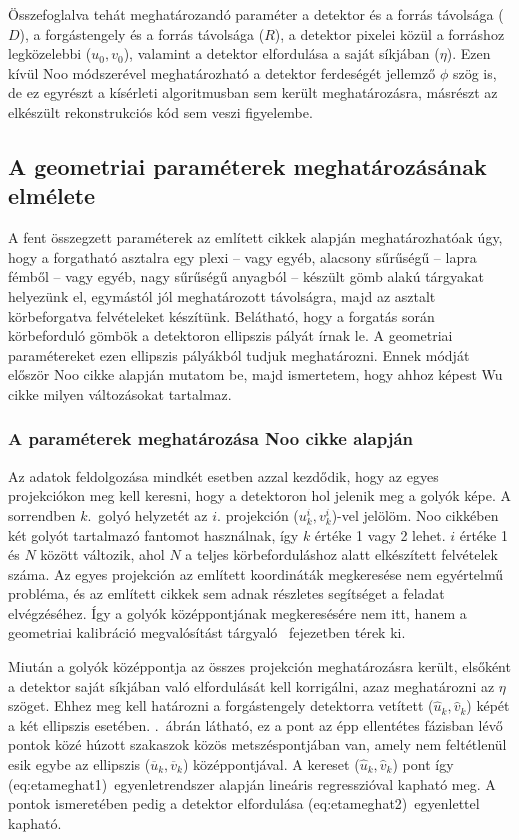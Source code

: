 \documentclass[a4paper,12pt]{article}
\begin{document}
 Összefoglalva tehát meghatározandó paraméter a detektor és a forrás távolsága ($D$), a forgástengely és a forrás távolsága ($R$), a detektor pixelei közül a forráshoz legközelebbi ($u_0,v_0$), valamint a detektor elfordulása a saját síkjában ($\eta$).  Ezen kívül Noo módszerével meghatározható a detektor ferdeségét jellemző $\phi$ szög is, de ez egyrészt a kísérleti algoritmusban sem került meghatározásra, másrészt az elkészült rekonstrukciós kód sem veszi figyelembe.
 

\subsection{A geometriai paraméterek meghatározásának elmélete}

A fent összegzett paraméterek az említett cikkek alapján meghatározhatóak úgy, hogy a forgatható asztalra egy plexi --  vagy egyéb, alacsony sűrűségű -- lapra fémből -- vagy egyéb, nagy sűrűségű anyagból -- készült gömb alakú tárgyakat helyezünk el, egymástól jól meghatározott távolságra, majd az asztalt körbeforgatva felvételeket készítünk. Belátható\cite{noo}, hogy a forgatás során körbeforduló gömbök a detektoron ellipszis pályát írnak le. A geometriai paramétereket ezen ellipszis pályákból tudjuk meghatározni.
Ennek módját először Noo cikke alapján mutatom be, majd ismertetem, hogy ahhoz képest Wu cikke milyen változásokat tartalmaz.

\subsubsection{A paraméterek meghatározása Noo\cite{noo} cikke alapján}
\label{sec:noo}


Az adatok feldolgozása mindkét esetben azzal kezdődik, hogy az egyes projekciókon meg kell keresni, hogy a detektoron hol jelenik meg a golyók képe. A sorrendben $k$.\ golyó helyzetét az $i$. projekción ($u_k^i, v_k^i$)-vel jelölöm. Noo cikkében két golyót tartalmazó fantomot használnak, így $k$ értéke 1 vagy 2 lehet. $i$ értéke 1 és $N$ között változik, ahol $N$ a teljes körbeforduláshoz alatt elkészített felvételek száma.  Az egyes projekción az említett koordináták megkeresése nem egyértelmű probléma, és az említett cikkek sem adnak részletes segítséget  a feladat elvégzéséhez. Így a golyók középpontjának megkeresésére nem itt, hanem a geometriai kalibráció megvalósítást tárgyaló \ fejezetben térek ki. 

Miután a golyók középpontja az összes projekción meghatározásra került, elsőként a detektor saját síkjában való elfordulását kell korrigálni, azaz meghatározni az $\eta$ szöget. Ehhez meg kell határozni a forgástengely detektorra vetített ($\hat{u}_k, \hat{v}_k$) képét a két ellipszis esetében. .~ábrán látható, ez a pont az épp ellentétes fázisban lévő pontok közé húzott szakaszok közös metszéspontjában van, amely nem feltétlenül esik egybe az ellipszis ($\overline{u}_k , \overline{v}_k$) középpontjával. A kereset ($\hat{u}_k, \hat{v}_k$) pont így \aref({eq:etameghat1})~egyenletrendszer alapján lineáris regresszióval kapható meg. A pontok ismeretében pedig a detektor elfordulása \aref({eq:etameghat2})~egyenlettel kapható.
\end{document}
